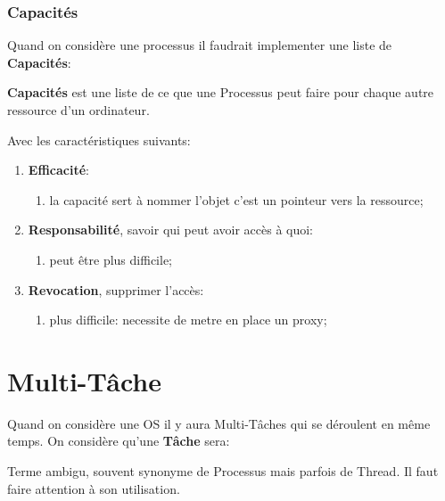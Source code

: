 \documentclass{article}
\begin{document}
\subsubsection*{Capacités}
Quand on considère une processus il faudrait implementer une liste de \textbf{Capacités}:
\begin{definition}
    \textbf{Capacités} est une liste de ce que une Processus peut faire pour chaque autre ressource d'un ordinateur.
\end{definition}
Avec les caractéristiques suivants:
\begin{enumerate}
    \item \textbf{Efficacité}:
    \begin{enumerate}[noitemsep]
        \item la capacité sert à nommer l'objet c'est un pointeur vers la ressource;
    \end{enumerate}

    \item \textbf{Responsabilité}, savoir qui peut avoir accès à quoi:
    \begin{enumerate}[noitemsep]
        \item peut être plus difficile;
    \end{enumerate}

    \item \textbf{Revocation}, supprimer l'accès:
    \begin{enumerate}[noitemsep]
        \item plus difficile: necessite de metre en place un proxy;
    \end{enumerate}
\end{enumerate}


\section{Multi-Tâche}

Quand on considère une OS il y aura Multi-Tâches qui se déroulent en même temps. On considère qu'une \textbf{Tâche} sera: 
\begin{definition}\label{def:tache}
    Terme ambigu, souvent synonyme de Processus mais parfois de Thread. Il faut faire attention à son utilisation.
\end{definition}
\end{document}
